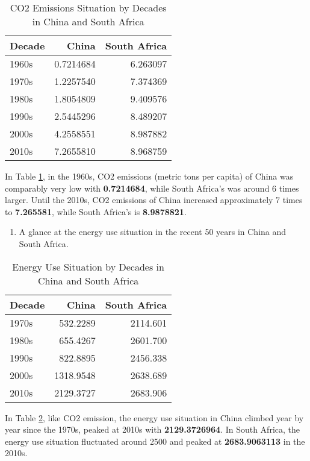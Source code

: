 \documentclass[11pt,a4paper,]{article}
\providecommand{\tightlist}{%
  \setlength{\itemsep}{0pt}\setlength{\parskip}{0pt}}
\begin{document}
\begin{table}[!h]

\caption{\label{tab:tab1}CO2 Emissions Situation by Decades in China and South Africa}
\centering
\begin{tabular}[t]{l|r|r}
\hline
Decade & China & South Africa\\
\hline
1960s & 0.7214684 & 6.263097\\
\hline
1970s & 1.2257540 & 7.374369\\
\hline
1980s & 1.8054809 & 9.409576\\
\hline
1990s & 2.5445296 & 8.489207\\
\hline
2000s & 4.2558551 & 8.987882\\
\hline
2010s & 7.2655810 & 8.968759\\
\hline
\end{tabular}
\end{table}

In Table \ref{tab:tab1}, in the 1960s, CO2 emissions (metric tons per capita) of China was comparably very low with \textbf{0.7214684}, while South Africa's was around 6 times larger. Until the 2010s, CO2 emissions of China increased approximately 7 times to \textbf{7.265581}, while South Africa's is \textbf{8.9878821}.

\begin{enumerate}
\def\labelenumi{(\arabic{enumi})}
\setcounter{enumi}{1}
\tightlist
\item
  A glance at the energy use situation in the recent 50 years in China and South Africa.
\end{enumerate}

\begin{table}[!h]

\caption{\label{tab:tab2}Energy Use Situation by Decades in China and South Africa}
\centering
\begin{tabular}[t]{l|r|r}
\hline
Decade & China & South Africa\\
\hline
1970s & 532.2289 & 2114.601\\
\hline
1980s & 655.4267 & 2601.700\\
\hline
1990s & 822.8895 & 2456.338\\
\hline
2000s & 1318.9548 & 2638.689\\
\hline
2010s & 2129.3727 & 2683.906\\
\hline
\end{tabular}
\end{table}

In Table \ref{tab:tab2}, like CO2 emission, the energy use situation in China climbed year by year since the 1970s, peaked at 2010s with \textbf{2129.3726964}. In South Africa, the energy use situation fluctuated around 2500 and peaked at \textbf{2683.9063113} in the 2010s.
\end{document}
